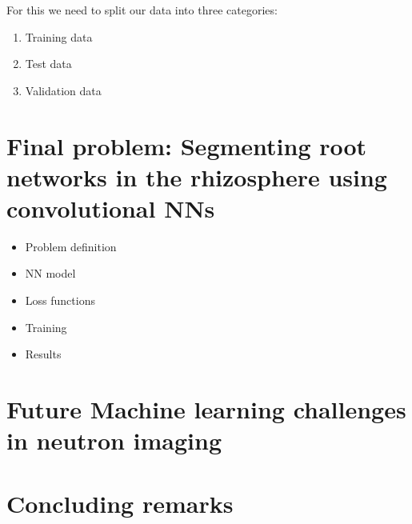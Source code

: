 \documentclass[letterpaper,10pt,english]{sphinxmanual}
\begin{document}
For this we need to split our data into three categories:
\begin{enumerate}
%
\item {} 
Training data

\item {} 
Test data

\item {} 
Validation data

\end{enumerate}


\chapter{Final problem: Segmenting root networks in the rhizosphere using convolutional NNs}
\label{\detokenize{ML4NeutronImageSegmentation:final-problem-segmenting-root-networks-in-the-rhizosphere-using-convolutional-nns}}\begin{itemize}
\item {} 
Problem definition

\item {} 
NN model

\item {} 
Loss functions

\item {} 
Training

\item {} 
Results

\end{itemize}


\chapter{Future Machine learning challenges in neutron imaging}
\label{\detokenize{ML4NeutronImageSegmentation:future-machine-learning-challenges-in-neutron-imaging}}

\chapter{Concluding remarks}
\label{\detokenize{ML4NeutronImageSegmentation:concluding-remarks}}






\renewcommand{\indexname}{Index}
\printindex
\end{document}
